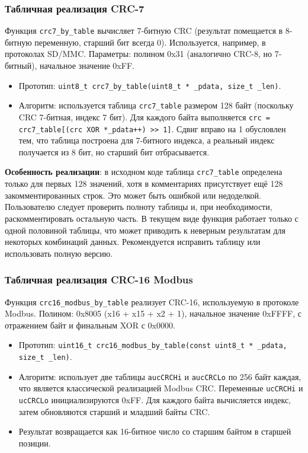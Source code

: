\documentclass[a4paper,12pt]{article}
\begin{document}
\subsubsection{Табличная реализация CRC-7}

Функция \texttt{crc7\_by\_table} вычисляет 7-битную CRC (результат помещается в 8-битную переменную, старший бит всегда 0). Используется, например, в протоколах SD/MMC. Параметры: полином 0x31 (аналогично CRC-8, но 7-битный), начальное значение 0xFF.

\begin{itemize}
    \item Прототип: \texttt{uint8\_t crc7\_by\_table(uint8\_t * \_pdata, size\_t \_len)}.
    \item Алгоритм: используется таблица \texttt{crc7\_table} размером 128 байт (поскольку CRC 7-битная, индекс 7 бит). Для каждого байта выполняется \texttt{crc = crc7\_table[(crc XOR *\_pdata++) >> 1]}. Сдвиг вправо на 1 обусловлен тем, что таблица построена для 7-битного индекса, а реальный индекс получается из 8 бит, но старший бит отбрасывается.
\end{itemize}

\textbf{Особенность реализации}: в исходном коде таблица \texttt{crc7\_table} определена только для первых 128 значений, хотя в комментариях присутствует ещё 128 закомментированных строк. Это может быть ошибкой или недоделкой. Пользователю следует проверить полноту таблицы и, при необходимости, раскомментировать остальную часть. В текущем виде функция работает только с одной половиной таблицы, что может приводить к неверным результатам для некоторых комбинаций данных. Рекомендуется исправить таблицу или использовать полную версию.

\subsubsection{Табличная реализация CRC-16 Modbus}

Функция \texttt{crc16\_modbus\_by\_table} реализует CRC-16, используемую в протоколе Modbus. Полином: 0x8005 (x16 + x15 + x2 + 1), начальное значение 0xFFFF, с отражением байт и финальным XOR с 0x0000.

\begin{itemize}
    \item Прототип: \texttt{uint16\_t crc16\_modbus\_by\_table(const uint8\_t * \_pdata, size\_t \_len)}.
    \item Алгоритм: использует две таблицы \texttt{aucCRCHi} и \texttt{aucCRCLo} по 256 байт каждая, что является классической реализацией Modbus CRC. Переменные \texttt{ucCRCHi} и \texttt{ucCRCLo} инициализируются 0xFF. Для каждого байта вычисляется индекс, затем обновляются старший и младший байты CRC.
    \item Результат возвращается как 16-битное число со старшим байтом в старшей позиции.
\end{itemize}
\end{document}
